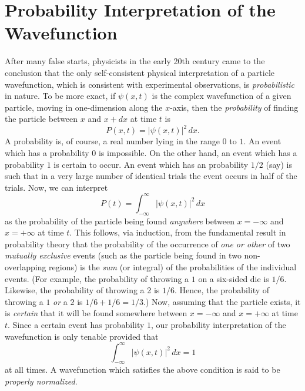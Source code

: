 \section{Probability Interpretation of the Wavefunction}\label{s12.6}
After many false starts, physicists in the early 20th century came to the conclusion that the only self-consistent physical
interpretation of a particle wavefunction, which is consistent with experimental observations, is {\em probabilistic}\/ in nature. To be more exact, if $\psi(x,t)$ is the
complex wavefunction of a given particle, moving in one-dimension along the $x$-axis, then the {\em probability}\/ of finding the particle between $x$ and
$x+dx$ at time $t$ is
\begin{equation}\label{e12.25}
P(x,t) = |\psi(x,t)|^2\,dx.
\end{equation}
A probability is, of course, a real number lying in the range $0$ to $1$. An event which has a probability $0$ is impossible. On the
other hand, an event which has a probability $1$ is certain to occur. An event which has an probability $1/2$ (say) is such that in a
very large number of identical trials the event occurs in half of the trials. Now, we can interpret
\begin{equation}
P(t) = \int_{-\infty}^\infty |\psi(x,t)|^2\,dx
\end{equation}
as the probability of the particle being found {\em anywhere}\/ between $x=-\infty$ and $x=+\infty$ at time $t$. This follows, via induction,
from the fundamental result in probability theory that the probability of the occurrence of {\em one or other}\/ of two {\em mutually exclusive}\/ events (such as the particle being found in two
non-overlapping regions) is the {\em sum}\/ (or integral) of the probabilities of the individual events. (For example, the probability
of throwing a $1$ on a six-sided  die is $1/6$. Likewise, the probability of throwing a 2 is $1/6$. Hence, the
probability of throwing a $1$ {\em or}\/ a $2$ is $1/6+1/6=1/3$.)
Now, assuming that the
particle exists, it is {\em certain}\/ that it will be found somewhere between  $x=-\infty$ and $x=+\infty$ at time $t$. Since a certain event
has probability $1$, our probability interpretation of the wavefunction is only tenable provided that
\begin{equation}\label{e12.24r}
\int_{-\infty}^\infty |\psi(x,t)|^2\,dx=1
\end{equation}
at all times. 
A wavefunction which satisfies the above condition is said to be {\em properly normalized}.

